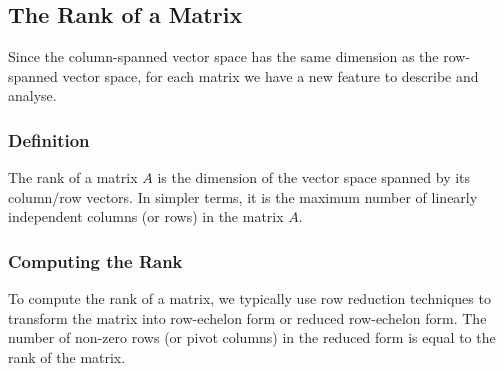 \subsection{The Rank of a Matrix}
Since the column-spanned vector space has the same dimension as the row-spanned vector space, for each matrix we have a new feature to describe and analyse.

\subsubsection{Definition}

The rank of a matrix \( A \) is the dimension of the vector space spanned by its column/row vectors. In simpler terms, it is the maximum number of linearly independent columns (or rows) in the matrix \( A \).
\\

\subsubsection{Computing the Rank}

To compute the rank of a matrix, we typically use row reduction techniques to transform the matrix into row-echelon form or reduced row-echelon form. The number of non-zero rows (or pivot columns) in the reduced form is equal to the rank of the matrix.